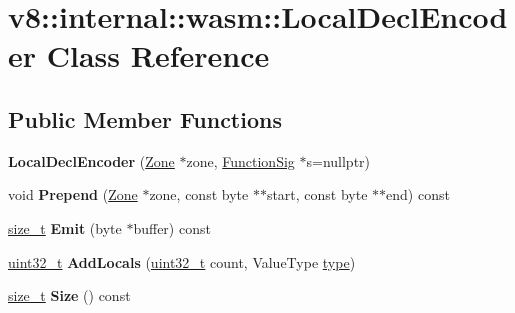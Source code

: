 \hypertarget{classv8_1_1internal_1_1wasm_1_1LocalDeclEncoder}{}\section{v8\+:\+:internal\+:\+:wasm\+:\+:Local\+Decl\+Encoder Class Reference}
\label{classv8_1_1internal_1_1wasm_1_1LocalDeclEncoder}
\subsection*{Public Member Functions}
\begin{DoxyCompactItemize}
\item 
\mbox{\label{classv8_1_1internal_1_1wasm_1_1LocalDeclEncoder_a9a41dd9976783866fbb6e75f0ad5969d}} 
{\bfseries Local\+Decl\+Encoder} (\mbox{\hyperlink{classv8_1_1internal_1_1Zone}{Zone}} $\ast$zone, \mbox{\hyperlink{classv8_1_1internal_1_1Signature}{Function\+Sig}} $\ast$s=nullptr)
\item 
\mbox{\label{classv8_1_1internal_1_1wasm_1_1LocalDeclEncoder_aa6560cb83bbec98080f7f7de84929e7b}} 
void {\bfseries Prepend} (\mbox{\hyperlink{classv8_1_1internal_1_1Zone}{Zone}} $\ast$zone, const byte $\ast$$\ast$start, const byte $\ast$$\ast$end) const
\item 
\mbox{\label{classv8_1_1internal_1_1wasm_1_1LocalDeclEncoder_ad10ead5939e949f9c80971b966e63a7e}} 
\mbox{\hyperlink{classsize__t}{size\+\_\+t}} {\bfseries Emit} (byte $\ast$buffer) const
\item 
\mbox{\label{classv8_1_1internal_1_1wasm_1_1LocalDeclEncoder_afd5a6493212259fa17b3a59dcb4204b9}} 
\mbox{\hyperlink{classuint32__t}{uint32\+\_\+t}} {\bfseries Add\+Locals} (\mbox{\hyperlink{classuint32__t}{uint32\+\_\+t}} count, Value\+Type \mbox{\hyperlink{classstd_1_1conditional_1_1type}{type}})
\item 
\mbox{\label{classv8_1_1internal_1_1wasm_1_1LocalDeclEncoder_ac53e9f85c8ed899a87b0c137b678f389}} 
\mbox{\hyperlink{classsize__t}{size\+\_\+t}} {\bfseries Size} () const

\end{DoxyCompactItemize}
